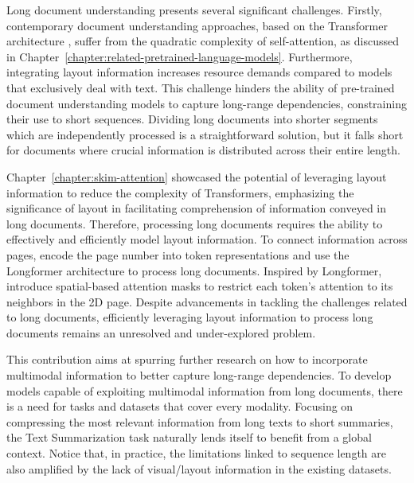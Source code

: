 

\newpage

\minitoc
{}

Long document understanding presents several significant challenges. Firstly, contemporary document understanding approaches, based on the Transformer architecture \citep{vaswani2017attention}, suffer from the quadratic complexity of self-attention, as discussed in Chapter~\ref{chapter:related-pretrained-language-models}. Furthermore, integrating layout information increases resource demands compared to models that exclusively deal with text. This challenge hinders the ability of pre-trained document understanding models to capture long-range dependencies, constraining their use to short sequences. Dividing long documents into shorter segments which are independently processed is a straightforward solution, but it falls short for documents where crucial information is distributed across their entire length.

Chapter~\ref{chapter:skim-attention} showcased the potential of leveraging layout information to reduce the complexity of Transformers, emphasizing the significance of layout in facilitating comprehension of information conveyed in long documents. Therefore, processing long documents requires the ability to effectively and efficiently model layout information. To connect information across pages, \citet{pramanik2020towards} encode the page number into token representations and use the Longformer architecture \citep{beltagy2020longformer} to process long documents. Inspired by Longformer, \citet{pham2022understanding} introduce spatial-based attention masks to restrict each token's attention to its neighbors in the 2D page. Despite advancements in tackling the challenges related to long documents, efficiently leveraging layout information to process long documents remains an unresolved and under-explored problem.

This contribution aims at spurring further research on how to incorporate multimodal information to better capture long-range dependencies. To develop models capable of exploiting multimodal information from long documents, there is a need for tasks and datasets that cover every modality. Focusing on compressing the most relevant information from long texts to short summaries, the Text Summarization task naturally lends itself to benefit from a global context. Notice that, in practice, the limitations linked to sequence length are also amplified by the lack of visual/layout information in the existing datasets. 

